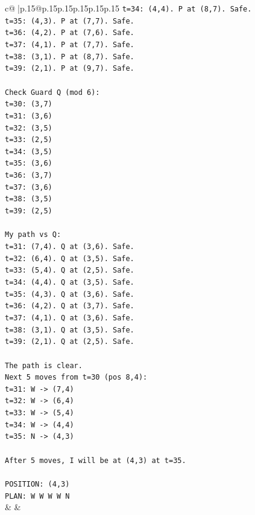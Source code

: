 \documentclass{article}
\begin{document}
{\begin{supertabular}{c@{$\;$}|p{.15\linewidth}@{}p{.15\linewidth}p{.15\linewidth}p{.15\linewidth}p{.15\linewidth}p{.15\linewidth}}
{{{\texttt{t=34: (4,4). P at (8,7). Safe.} \\
\texttt{t=35: (4,3). P at (7,7). Safe.} \\
\texttt{t=36: (4,2). P at (7,6). Safe.} \\
\texttt{t=37: (4,1). P at (7,7). Safe.} \\
\texttt{t=38: (3,1). P at (8,7). Safe.} \\
\texttt{t=39: (2,1). P at (9,7). Safe.} \\
\\ 
\texttt{Check Guard Q (mod 6):} \\
\texttt{t=30: (3,7)} \\
\texttt{t=31: (3,6)} \\
\texttt{t=32: (3,5)} \\
\texttt{t=33: (2,5)} \\
\texttt{t=34: (3,5)} \\
\texttt{t=35: (3,6)} \\
\texttt{t=36: (3,7)} \\
\texttt{t=37: (3,6)} \\
\texttt{t=38: (3,5)} \\
\texttt{t=39: (2,5)} \\
\\ 
\texttt{My path vs Q:} \\
\texttt{t=31: (7,4). Q at (3,6). Safe.} \\
\texttt{t=32: (6,4). Q at (3,5). Safe.} \\
\texttt{t=33: (5,4). Q at (2,5). Safe.} \\
\texttt{t=34: (4,4). Q at (3,5). Safe.} \\
\texttt{t=35: (4,3). Q at (3,6). Safe.} \\
\texttt{t=36: (4,2). Q at (3,7). Safe.} \\
\texttt{t=37: (4,1). Q at (3,6). Safe.} \\
\texttt{t=38: (3,1). Q at (3,5). Safe.} \\
\texttt{t=39: (2,1). Q at (2,5). Safe.} \\
\\ 
\texttt{The path is clear.} \\
\texttt{Next 5 moves from t=30 (pos 8,4):} \\
\texttt{t=31: W {-}> (7,4)} \\
\texttt{t=32: W {-}> (6,4)} \\
\texttt{t=33: W {-}> (5,4)} \\
\texttt{t=34: W {-}> (4,4)} \\
\texttt{t=35: N {-}> (4,3)} \\
\\ 
\texttt{After 5 moves, I will be at (4,3) at t=35.} \\
\\ 
\texttt{POSITION: (4,3)} \\
\texttt{PLAN: W W W W N} \\
            }
        }
    }
    & & \\ \\


\end{supertabular}}
\end{document}
